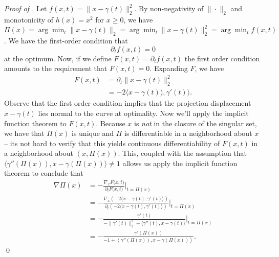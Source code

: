\documentclass[11pt]{article}
\begin{document}
\noindent \textit{Proof of .} Let $f(x,t) = \|x - \gamma(t)\|_2^2$. By non-negativity of $\|\cdot\|_2$ and monotonicity of $h(x) = x^2$ for $x \geq 0$, we have $\Pi(x) = \arg\min_t \|x - \gamma(t)\|_2 = \arg \min_t \|x - \gamma(t)\|_2^2 = \arg\min_t f(x, t)$. We have the first-order condition that 
\[ \partial_t f(x,t) = 0\]
at the optimum. Now, if we define $F(x, t) = \partial_t f(x,t)$ the first order condition amounts to the requirement that $F(x,t) = 0$. Expanding $F$, we have
\begin{align}
    F(x, t) &= \partial_t \|x - \gamma(t)\|_2^2 \\ \label{eq: ift}
    &= -2\langle x - \gamma(t)), \gamma'(t)\rangle.
\end{align}
Observe that the first order condition implies that the projection displacement $x - \gamma(t)$ lies normal to the curve at optimality. 
Now we'll apply the implicit function theorem to $F(x, t)$. Because $x$ is \textit{not} in the closure of the singular set, we have that $\Pi(x)$ is unique and $\Pi$ is differentiable in a neighborhood about $x$ -- its not hard to verify that this yields continuous differentiability of $F(x,t)$ in a neighborhood about $(x, \Pi(x))$. This, coupled with the assumption that $\langle\gamma''(\Pi(x)), x - \gamma(\Pi(x))\rangle \neq 1$ allows us apply the implicit function theorem to conclude that 
\begin{align}
    \nabla\Pi(x) &= - \frac{\nabla_x F\big(x, t\big)}{\partial_t F\big(x, t\big)} \Bigg|_{t = \Pi(x)}\\
    &= - \frac{\nabla_x\left(-2\langle x - \gamma(t), \gamma'(t)\rangle\right)}{\partial_t \left(-2\langle x - \gamma(t), \gamma'(t)\rangle\right)} \Bigg|_{t = \Pi(x)}\\
    &= -\frac{\gamma'(t)}{-\|\gamma'(t)\|_2^2 + 
    \langle\gamma''(t), x - \gamma(t)\rangle}\Bigg|_{t = \Pi(x)} \label{eq: projection grad} \\ 
    &= -\frac{\gamma'(\Pi(x))}{-1 + \left\langle\gamma''(\Pi(x)), x - \gamma(\Pi(x))\right\rangle}.
\end{align}
\qed{}
\end{document}
